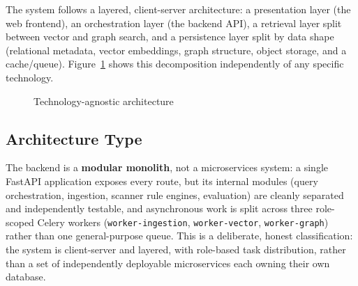 \documentclass[12pt,a4paper]{report}
\begin{document}
The system follows a layered, client-server architecture: a presentation
layer (the web frontend), an orchestration layer (the backend \ac{API}), a
retrieval layer split between vector and graph search, and a persistence
layer split by data shape (relational metadata, vector embeddings, graph
structure, object storage, and a cache/queue). Figure~\ref{fig:arch-generic}
shows this decomposition independently of any specific technology.

\begin{figure}[H]
\centering
{}
\caption{Technology-agnostic architecture}
\label{fig:arch-generic}
\end{figure}

\subsection{Architecture Type}

The backend is a \textbf{modular monolith}, not a microservices system:
a single FastAPI application exposes every route, but its internal modules
(query orchestration, ingestion, scanner rule engines, evaluation) are
cleanly separated and independently testable, and asynchronous work is
split across three role-scoped Celery workers (\texttt{worker-ingestion},
\texttt{worker-vector}, \texttt{worker-graph}) rather than one general-purpose
queue. This is a deliberate, honest classification: the system is
client-server and layered, with role-based task distribution, rather than a
set of independently deployable microservices each owning their own
database.
\end{document}
